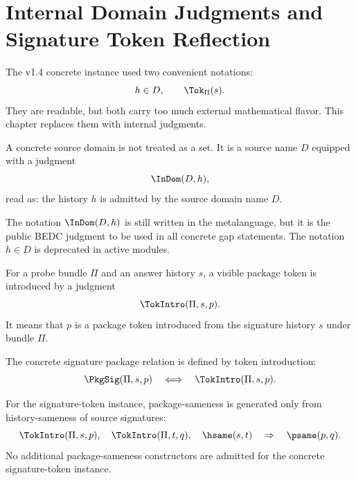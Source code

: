 \chapter{Internal Domain Judgments and Signature Token Reflection}
\label{ch:v15-domain-token-reflection}

The v1.4 concrete instance used two convenient notations:
\[
  h\in D,
  \qquad
  \Tok_{\Pi}(s).
\]
They are readable, but both carry too much external mathematical flavor. This chapter replaces them with internal judgments.

\begin{definition}
A concrete source domain is not treated as a set. It is a source name \(D\) equipped with a judgment
\[
  \InDom(D,h),
\]
read as: the history \(h\) is admitted by the source domain name \(D\).
\end{definition}

\begin{remark}
The notation \(\InDom(D,h)\) is still written in the metalanguage, but it is the public BEDC judgment to be used in all concrete gap statements. The notation \(h\in D\) is deprecated in active modules.
\end{remark}

\begin{definition}
For a probe bundle \(\Pi\) and an answer history \(s\), a visible package token is introduced by a judgment
\[
  \TokIntro(\Pi,s,p).
\]
It means that \(p\) is a package token introduced from the signature history \(s\) under bundle \(\Pi\).
\end{definition}

\begin{definition}
The concrete signature package relation is defined by token introduction:
\[
  \PkgSig(\Pi,s,p)
  \quad\Longleftrightarrow\quad
  \TokIntro(\Pi,s,p).
\]
\end{definition}

\begin{definition}
For the signature-token instance, package-sameness is generated only from history-sameness of source signatures:
\[
  \TokIntro(\Pi,s,p),\quad
  \TokIntro(\Pi,t,q),\quad
  \hsame(s,t)
  \quad\Rightarrow\quad
  \psame(p,q).
\]
No additional package-sameness constructors are admitted for the concrete signature-token instance.
\end{definition}

